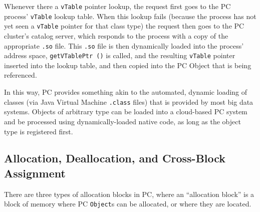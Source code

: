 Whenever there a \texttt{vTable} pointer lookup, the request first goes to the PC process' \texttt{vTable} lookup table.  When this 
lookup fails (because the process has not yet seen a \texttt{vTable} pointer for that class
type) the request then goes to the PC cluster's catalog server, which responds to the process with a copy of the appropriate \texttt{.so} file.  This 
\texttt{.so} file is then 
dynamically loaded into the process' address space, \texttt{getVTablePtr ()} is called, 
and the resulting \texttt{vTable} pointer inserted into the lookup table, and then copied into the PC Object that is being referenced.  

In this way, PC provides something akin to the automated,
dynamic loading of classes (via Java Virtual Machine \texttt{.class} files) that is
provided by most big data systems.  
Objects of arbitrary type can be loaded into a cloud-based PC system and be processed using dynamically-loaded native code, as long
as the object type is registered first.

\subsection{Allocation, Deallocation, and Cross-Block Assignment}

There are three types of allocation blocks in PC, where an ``allocation block'' is a block of memory where PC \texttt{Object}s can be
allocated, or where they are located.

